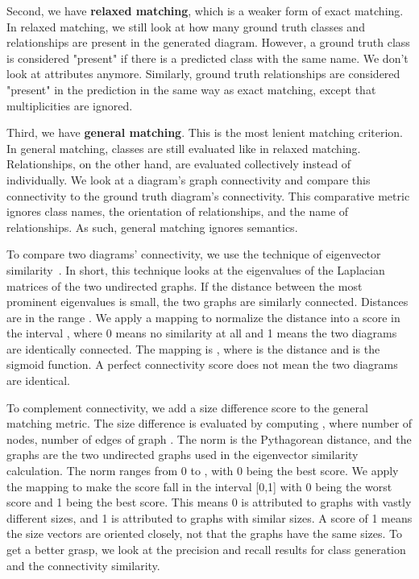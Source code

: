 \documentclass[sigconf]{acmart}
\begin{document}
Second, we have \textbf{relaxed matching}, which is a weaker form of exact matching. In relaxed matching, we still look at how many ground truth classes and relationships are present in the generated diagram. However, a ground truth class is considered "present" if there is a predicted class with the same name. We don't look at attributes anymore. Similarly, ground truth relationships are considered "present" in the prediction in the same way as exact matching, except that multiplicities are ignored.

Third, we have \textbf{general matching}. This is the most lenient matching criterion. In general matching, classes are still evaluated like in relaxed matching. Relationships, on the other hand, are evaluated collectively instead of individually. We look at a diagram's graph connectivity and compare this connectivity to the ground truth diagram's connectivity. This comparative metric ignores class names, the orientation of relationships, and the name of relationships. As such, general matching ignores semantics.

To compare two diagrams' connectivity, we use the technique of eigenvector similarity~\cite{eigen_energy}. In short, this technique looks at the eigenvalues of the Laplacian matrices of the two undirected graphs. If the distance between the most prominent eigenvalues is small, the two graphs are similarly connected. Distances are in the range . We apply a mapping to normalize the distance into a score in the interval , where 0 means no similarity at all and 1 means the two diagrams are identically connected. The mapping is , where  is the distance and  is the sigmoid function. A perfect connectivity score does not mean the two diagrams are identical.



To complement connectivity, we add a size difference score to the general matching metric. The size difference is evaluated by computing , where number of nodes, number of edges of graph . The norm is the Pythagorean distance, and the graphs are the two undirected graphs used in the eigenvector similarity calculation. The norm ranges from 0 to , with 0 being the best score. We apply the mapping  to make the score fall in the interval [0,1] with 0 being the worst score and 1 being the best score. This means 0 is attributed to graphs with vastly different sizes, and 1 is attributed to graphs with similar sizes. A score of 1 means the size vectors  are oriented closely, not that the graphs have the same sizes. To get a better grasp, we look at the precision and recall results for class generation and the connectivity similarity.
\end{document}
